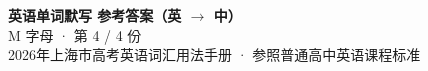 \documentclass[10pt,a4paper]{article}
\begin{document}
\pagestyle{plain}

\begin{center}
{\LARGE\bfseries 英语单词默写 \quad 参考答案（英 $\to$ 中）}\\[0.22em]
{\large M 字母 · 第 4 / 4 份}\\[0.18em]
{\small 2026年上海市高考英语词汇用法手册 · 参照普通高中英语课程标准}
\end{center}

\vspace{0.2em}
\noindent{\color{rulegray}\rule{\textwidth}{0.8pt}}

\vspace{0.35em}

\vspace{0.25em}
\renewcommand{\arraystretch}{1.32}
\end{document}
